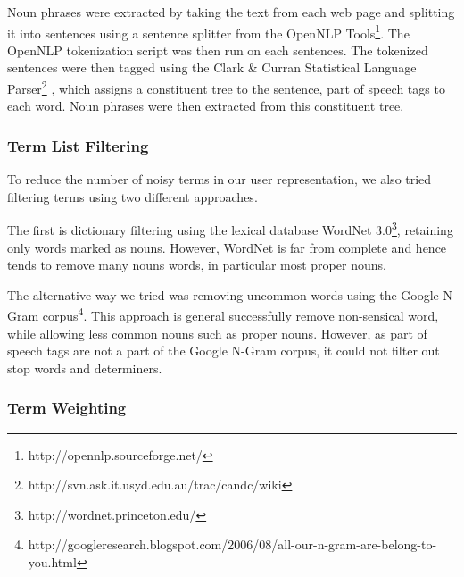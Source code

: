 \documentclass{sig-alternate}
\begin{document}
\vspace{1mm}

Noun phrases were extracted by taking the text from each web page and splitting it into sentences using a sentence splitter from the OpenNLP Tools\footnote{http://opennlp.sourceforge.net/}. The OpenNLP tokenization script was then run on each sentences. The tokenized sentences were then tagged using the Clark \& Curran Statistical Language Parser\footnote{http://svn.ask.it.usyd.edu.au/trac/candc/wiki} \cite{Clark:Curran}, which assigns a constituent tree to the sentence, part of speech tags to each word. Noun phrases were then extracted from this constituent tree.


\subsubsection{Term List Filtering}

To reduce the number of noisy terms in our user representation, we also tried filtering terms using two different approaches. 

The first is dictionary filtering using the lexical database WordNet 3.0\footnote{http://wordnet.princeton.edu/}, retaining only words marked as nouns. However, WordNet is far from complete and hence tends to remove many nouns words, in particular most proper nouns.

The alternative way we tried was removing uncommon words using the Google N-Gram corpus\footnote{http://googleresearch.blogspot.com/2006/08/all-our-n-gram-are-belong-to-you.html}. This approach is general successfully remove non-sensical word, while allowing less common nouns such as proper nouns. However, as part of speech tags are not a part of the Google N-Gram corpus, it could not filter out stop words and determiners.

\subsubsection{Term Weighting}
\end{document}
